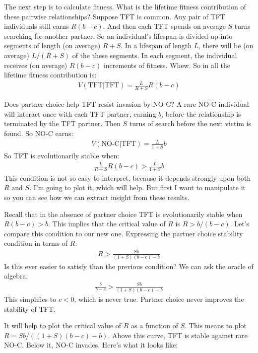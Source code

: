\documentclass[10pt,reqno]{amsbook}
\numberwithin{equation}{chapter}
\begin{document}
The next step is to calculate fitness. What is the lifetime fitness contribution of these pairwise relationships? Suppose TFT is common. Any pair of TFT individuals still earns $R(b-c)$. And then each TFT spends on average $S$ turns searching for another partner. So an individual's lifespan is divided up into segments of length (on average) $R+S$. In a lifespan of length $L$, there will be (on average) $L/(R+S)$ of the these segments. In each segment, the individual receives (on average) $R(b-c)$ increments of fitness. Whew. So in all the lifetime fitness contribution is:
\begin{align*}
	V(\text{TFT}|\text{TFT}) = \frac{L}{R+S}R(b-c)
\end{align*}

Does partner choice help TFT resist invasion by NO-C? A rare NO-C individual will interact once with each TFT partner, earning $b$, before the relationship is terminated by the TFT partner. Then $S$ turns of search before the next victim is found. So NO-C earns:
\begin{align*}
	V(\text{NO-C}|\text{TFT}) = \frac{L}{1+S}b
\end{align*}
So TFT is evolutionarily stable when:
\begin{align*}
	\frac{L}{R+S}R(b-c) > \frac{L}{1+S}b
\end{align*}
This condition is not so easy to interpret, because it depends strongly upon both $R$ and $S$. I'm going to plot it, which will help. But first I want to manipulate it so you can see how we can extract insight from these results. 

Recall that in the absence of partner choice TFT is evolutionarily stable when $R(b-c)>b$. This implies that the critical value of $R$ is $R>b/(b-c)$. Let's compare this condition to our new one. Expressing the partner choice stability condition in terms of $R$:
\begin{align*}
	R > \frac{Sb}{(1+S)(b-c)-b}
\end{align*}
Is this ever easier to satisfy than the previous condition? We can ask the oracle of algebra:
\begin{align*}
	\frac{b}{b-c} > \frac{Sb}{(1+S)(b-c)-b}
\end{align*}
This simplifies to $c<0$, which is never true. Partner choice never improves the stability of TFT.

It will help to plot the critical value of $R$ as a function of $S$. This means to plot $R={Sb}/{((1+S)(b-c)-b)}$. Above this curve, TFT is stable against rare NO-C. Below it, NO-C invades. Here's what it looks like:
\end{document}

